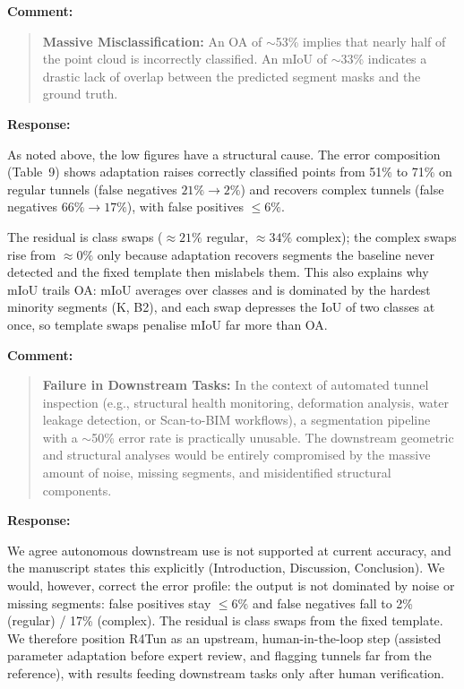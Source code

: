 \documentclass[11pt,a4paper]{article}
\newenvironment{commentblock}{%
  \par\smallskip\noindent\textbf{Comment:}\par
  \begin{quote}\itshape\color{black}
}{%
  \end{quote}\smallskip
}
\newenvironment{responseblock}{%
  \par\smallskip\noindent\textbf{Response:}\par
  \begingroup\color{responsegreen}
}{%
  \endgroup\smallskip
}
\begin{document}
\begin{commentblock}
\textbf{Massive Misclassification:} An OA of $\sim$53\% implies that nearly half of the point cloud is incorrectly classified. An mIoU of $\sim$33\% indicates a drastic lack of overlap between the predicted segment masks and the ground truth.
\end{commentblock}
\begin{responseblock}
As noted above, the low figures have a structural cause. The error composition (Table~9) shows adaptation raises correctly classified points from 51\% to 71\% on regular tunnels (false negatives $21\% \rightarrow 2\%$) and recovers complex tunnels (false negatives $66\% \rightarrow 17\%$), with false positives $\leq 6\%$. 

The residual is class swaps ($\approx 21\%$ regular, $\approx 34\%$ complex); the complex swaps rise from $\approx 0\%$ only because adaptation recovers segments the baseline never detected and the fixed template then mislabels them. This also explains why mIoU trails OA: mIoU averages over classes and is dominated by the hardest minority segments (K, B2), and each swap depresses the IoU of two classes at once, so template swaps penalise mIoU far more than OA.

\end{responseblock}

\begin{commentblock}
\textbf{Failure in Downstream Tasks:} In the context of automated tunnel inspection (e.g., structural health monitoring, deformation analysis, water leakage detection, or Scan-to-BIM workflows), a segmentation pipeline with a $\sim$50\% error rate is practically unusable. The downstream geometric and structural analyses would be entirely compromised by the massive amount of noise, missing segments, and misidentified structural components.
\end{commentblock}
\begin{responseblock}
We agree autonomous downstream use is not supported at current accuracy, and the manuscript states this explicitly (Introduction, Discussion, Conclusion). We would, however, correct the error profile: the output is not dominated by noise or missing segments: false positives stay $\leq 6\%$ and false negatives fall to 2\% (regular) / 17\% (complex). The residual is class swaps from the fixed template. We therefore position R4Tun as an upstream, human-in-the-loop step (assisted parameter adaptation before expert review, and flagging tunnels far from the reference), with results feeding downstream tasks only after human verification.
\end{responseblock}
\end{document}
